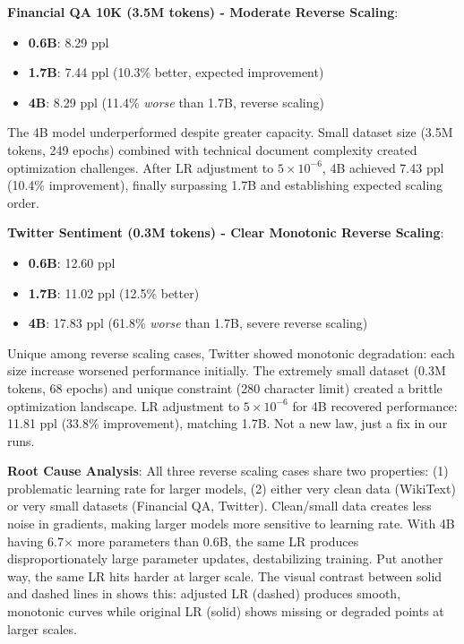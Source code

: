 \textbf{Financial QA 10K (3.5M tokens) - Moderate Reverse Scaling}:
\begin{itemize}
\item \textbf{0.6B}: 8.29 ppl
\item \textbf{1.7B}: 7.44 ppl (10.3\% better, expected improvement)
\item \textbf{4B}: 8.29 ppl (11.4\% \textit{worse} than 1.7B, reverse scaling)
\end{itemize}

The 4B model underperformed despite greater capacity. Small dataset size (3.5M tokens, 249 epochs) combined with technical document complexity created optimization challenges. After LR adjustment to $5 \times 10^{-6}$, 4B achieved 7.43 ppl (10.4\% improvement), finally surpassing 1.7B and establishing expected scaling order.

\textbf{Twitter Sentiment (0.3M tokens) - Clear Monotonic Reverse Scaling}:
\begin{itemize}
\item \textbf{0.6B}: 12.60 ppl
\item \textbf{1.7B}: 11.02 ppl (12.5\% better)
\item \textbf{4B}: 17.83 ppl (61.8\% \textit{worse} than 1.7B, severe reverse scaling)
\end{itemize}

Unique among reverse scaling cases, Twitter showed monotonic degradation: each size increase worsened performance initially. The extremely small dataset (0.3M tokens, 68 epochs) and unique constraint (280 character limit) created a brittle optimization landscape. LR adjustment to $5 \times 10^{-6}$ for 4B recovered performance: 11.81 ppl (33.8\% improvement), matching 1.7B. Not a new law, just a fix in our runs.

\textbf{Root Cause Analysis}: All three reverse scaling cases share two properties: (1) problematic learning rate for larger models, (2) either very clean data (WikiText) or very small datasets (Financial QA, Twitter). Clean/small data creates less noise in gradients, making larger models more sensitive to learning rate. With 4B having 6.7$\times$ more parameters than 0.6B, the same LR produces disproportionately large parameter updates, destabilizing training. Put another way, the same LR hits harder at larger scale. The visual contrast between solid and dashed lines in  shows this: adjusted LR (dashed) produces smooth, monotonic curves while original LR (solid) shows missing or degraded points at larger scales.

